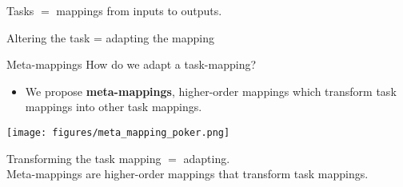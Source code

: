 \documentclass{beamer}
\begin{document}
\begin{frame}[standout]
Tasks \(\bm =\) mappings from inputs to outputs. 
\end{frame}

%
%

\begin{frame}{Altering the task = adapting the mapping}
\end{frame}


\begin{frame}{Meta-mappings}
How do we adapt a task-mapping?
\begin{itemize}
\item We propose \textbf{meta-mappings}, higher-order mappings which transform task mappings into other task mappings.
\end{itemize}
\texttt{[image: figures/meta\_mapping\_poker.png]}
\end{frame}

\begin{frame}[standout]
Transforming the task mapping \(=\) adapting. \\[1em]
Meta-mappings are higher-order mappings that transform task mappings.
\end{frame}
\end{document}
